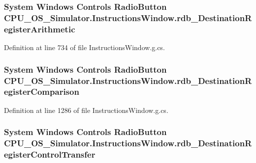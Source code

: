 \subsubsection[{rdb\+\_\+\+Destination\+Register\+Arithmetic}]{\setlength{\rightskip}{0pt plus 5cm}System Windows Controls Radio\+Button C\+P\+U\+\_\+\+O\+S\+\_\+\+Simulator.\+Instructions\+Window.\+rdb\+\_\+\+Destination\+Register\+Arithmetic\hspace{0.3cm}{\ttfamily [package]}}\label{class_c_p_u___o_s___simulator_1_1_instructions_window_a40ebdc8941fbd7ae75ca6d14d1153569}


Definition at line 734 of file Instructions\+Window.\+g.\+cs.

\hypertarget{class_c_p_u___o_s___simulator_1_1_instructions_window_af5369f91639cf92cbb6bd89118d6e373}{}
\subsubsection[{rdb\+\_\+\+Destination\+Register\+Comparison}]{\setlength{\rightskip}{0pt plus 5cm}System Windows Controls Radio\+Button C\+P\+U\+\_\+\+O\+S\+\_\+\+Simulator.\+Instructions\+Window.\+rdb\+\_\+\+Destination\+Register\+Comparison\hspace{0.3cm}{\ttfamily [package]}}\label{class_c_p_u___o_s___simulator_1_1_instructions_window_af5369f91639cf92cbb6bd89118d6e373}


Definition at line 1286 of file Instructions\+Window.\+g.\+cs.

\hypertarget{class_c_p_u___o_s___simulator_1_1_instructions_window_a4911636b6e093aa89155a0f5db4b3118}{}
\subsubsection[{rdb\+\_\+\+Destination\+Register\+Control\+Transfer}]{\setlength{\rightskip}{0pt plus 5cm}System Windows Controls Radio\+Button C\+P\+U\+\_\+\+O\+S\+\_\+\+Simulator.\+Instructions\+Window.\+rdb\+\_\+\+Destination\+Register\+Control\+Transfer\hspace{0.3cm}{\ttfamily [package]}}\label{class_c_p_u___o_s___simulator_1_1_instructions_window_a4911636b6e093aa89155a0f5db4b3118}


